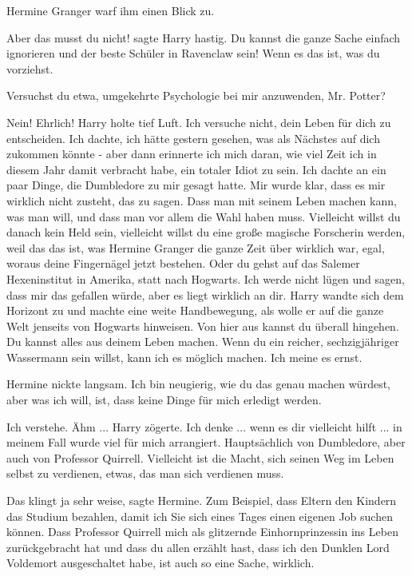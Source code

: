 Hermine Granger warf ihm einen Blick zu.

\glqq{}Aber das musst du nicht!\grqq{} sagte Harry hastig. \glqq{}Du kannst die
ganze Sache einfach ignorieren und der beste Schüler in Ravenclaw sein! Wenn es
das ist, was du vorziehst.\grqq{}

\glqq{}Versuchst du etwa, umgekehrte Psychologie bei mir anzuwenden, Mr. Potter?\grqq{}

\glqq{}Nein! Ehrlich!\grqq{} Harry holte tief Luft. \glqq{}Ich versuche nicht,
dein Leben für dich zu entscheiden. Ich dachte, ich hätte gestern gesehen, was
als Nächstes auf dich zukommen könnte - aber dann erinnerte ich mich daran, wie
viel Zeit ich in diesem Jahr damit verbracht habe, ein totaler Idiot zu sein.
Ich dachte an ein paar Dinge, die Dumbledore zu mir gesagt hatte. Mir wurde
klar, dass es mir wirklich nicht zusteht, das zu sagen. Dass man mit seinem
Leben machen kann, was man will, und dass man vor allem die Wahl haben muss.
Vielleicht willst du danach kein Held sein, vielleicht willst du eine große
magische Forscherin werden, weil das das ist, was Hermine Granger die ganze Zeit
über wirklich war, egal, woraus deine Fingernägel jetzt bestehen. Oder du gehst
auf das Salemer Hexeninstitut in Amerika, statt nach Hogwarts. Ich werde nicht
lügen und sagen, dass mir das gefallen würde, aber es liegt wirklich an
dir.\grqq{} Harry wandte sich dem Horizont zu und machte eine weite
Handbewegung, als wolle er auf die ganze Welt jenseits von Hogwarts hinweisen.
\glqq{}Von hier aus kannst du überall hingehen. Du kannst alles aus deinem Leben
machen. Wenn du ein reicher, sechzigjähriger Wassermann sein willst, kann ich es
möglich machen. Ich meine es ernst.\grqq{}

Hermine nickte langsam. \glqq{}Ich bin neugierig, wie du das genau machen
würdest, aber was ich will, ist, dass keine Dinge für mich erledigt
werden.\grqq{}

\glqq{}Ich verstehe. Ähm ...\grqq{} Harry zögerte. \glqq{}Ich denke ... wenn es dir
vielleicht hilft ... in meinem Fall wurde viel für mich arrangiert. Hauptsächlich
von Dumbledore, aber auch von Professor Quirrell. Vielleicht ist die Macht, sich
seinen Weg im Leben selbst zu verdienen, etwas, das man sich verdienen
muss.\grqq{}

\glqq{}Das klingt ja sehr weise\grqq{}, sagte Hermine. \glqq{}Zum Beispiel, dass
Eltern den Kindern das Studium bezahlen, damit ich Sie sich eines Tages einen
eigenen Job suchen können. Dass Professor Quirrell mich als glitzernde
Einhornprinzessin ins Leben zurückgebracht hat und dass du allen erzählt hast,
dass ich den Dunklen Lord Voldemort ausgeschaltet habe, ist auch so eine Sache,
wirklich.\grqq{}

